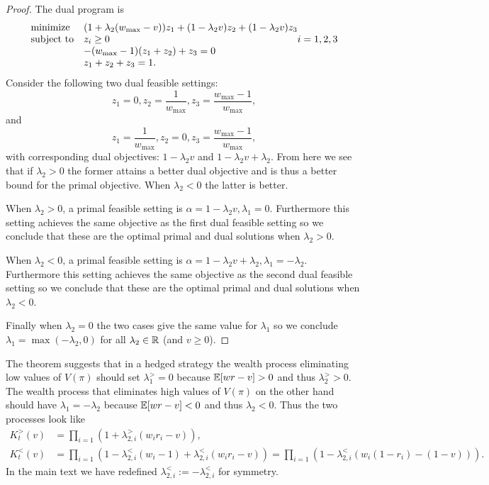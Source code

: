 \begin{proof}
The dual program is
\begin{equation*}
\begin{array}{ll@{}ll}
\text{minimize}  & (1+\lambda_2(w_{\max}-v))z_1 +(1-\lambda_2 v) z_2 + (1-\lambda_2 v) z_3 &\\
\text{subject to}& z_i \geq 0  & i=1,2,3 \\
                 & -(w_{\max}-1)(z_1+z_2)+z_3 = 0 \\
                 & z_1+z_2+z_3=1. \\
\end{array}
\end{equation*}
Consider the following two dual feasible settings:
\[
z_1=0,z_2=\frac{1}{w_{\max}}, z_3=\frac{w_{\max}-1}{w_{\max}},
\]
and 
\[
z_1=\frac{1}{w_{\max}}, z_2=0, z_3=\frac{w_{\max}-1}{w_{\max}},
\]
with corresponding dual objectives: $1-\lambda_2 v$ and $1-\lambda_2 v + \lambda_2$. From here we see that if $\lambda_2 > 0$ the former attains a
better dual objective and is thus a better bound
for the primal objective. When $\lambda_2<0$ the latter
is better. 

When $\lambda_2>0$, a primal feasible setting is
$\alpha=1-\lambda_2 v,\lambda_1=0$. Furthermore this setting
achieves the same objective as the first dual feasible setting so 
we conclude that these are the optimal primal and dual solutions when $\lambda_2>0$.

When $\lambda_2<0$, a primal feasible setting is 
$\alpha=1-\lambda_2 v +\lambda_2, \lambda_1=-\lambda_2$. Furthermore this setting
achieves the same objective as the second dual feasible setting
so we conclude that these are the optimal primal and dual solutions when $\lambda_2<0$. 

Finally when $\lambda_2=0$ the two cases give the same value for $\lambda_1$ so we conclude $\lambda_1=\max(-\lambda_2,0)$ for all $\lambda_2 \in \mathbb{R}$ (and $v\geq 0$).
\end{proof}

The theorem suggests that in a hedged strategy the wealth process
eliminating low values of $V(\pi)$ should set 
$\lambda_1^{>} = 0$ because $\mathbb{E}[wr-v] >0$ and thus $\lambda_2^{>} >0$.
The wealth process that eliminates high values of $V(\pi)$
on the other hand should have 
$\lambda_1 = -\lambda_2$ because $\mathbb{E}[wr-v] <0$ and thus $\lambda_2<0$.
Thus the two processes look like
\begin{align*}
K_t^{>}(v)&=\prod_{i=1} \left(1+\lambda_{2,i}^{>} (w_i r_i -v)\right),\\
K_t^{<}(v)&=\prod_{i=1} \left(1-\lambda_{2,i}^{<} (w_i - 1) + \lambda_{2,i}^{<} \left(w_i r_i -v\right)\right)=\prod_{i=1} \left(1-\lambda_{2,i}^{<} \left(w_i (1-r_i) -  (1-v)\right)\right).
\end{align*}
In the main text we have redefined $\lambda_{2,i}^{<}:=-\lambda_{2,i}^{<}$
for symmetry.

